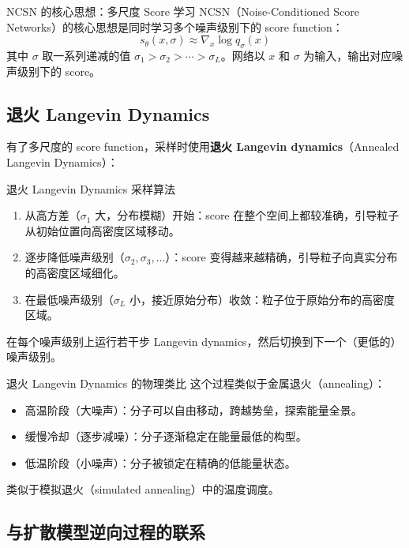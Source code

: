 \begin{importantbox}{NCSN 的核心思想：多尺度 Score 学习}
NCSN（Noise-Conditioned Score Networks）的核心思想是同时学习多个噪声级别下的 score function：
$$s_\theta(x, \sigma) \approx \nabla_x \log q_\sigma(x)$$
其中 $\sigma$ 取一系列递减的值 $\sigma_1 > \sigma_2 > \cdots > \sigma_L$。网络以 $x$ 和 $\sigma$ 为输入，输出对应噪声级别下的 score。
\end{importantbox}

\subsection{退火 Langevin Dynamics}

有了多尺度的 score function，采样时使用\textbf{退火 Langevin dynamics}（Annealed Langevin Dynamics）：

\begin{importantbox}{退火 Langevin Dynamics 采样算法}
\begin{enumerate}
    \item 从高方差（$\sigma_1$ 大，分布模糊）开始：score 在整个空间上都较准确，引导粒子从初始位置向高密度区域移动。
    \item 逐步降低噪声级别（$\sigma_2, \sigma_3, \ldots$）：score 变得越来越精确，引导粒子向真实分布的高密度区域细化。
    \item 在最低噪声级别（$\sigma_L$ 小，接近原始分布）收敛：粒子位于原始分布的高密度区域。
\end{enumerate}
在每个噪声级别上运行若干步 Langevin dynamics，然后切换到下一个（更低的）噪声级别。
\end{importantbox}

\begin{knowledgebox}{退火 Langevin Dynamics 的物理类比}
这个过程类似于金属退火（annealing）：
\begin{itemize}
    \item 高温阶段（大噪声）：分子可以自由移动，跨越势垒，探索能量全景。
    \item 缓慢冷却（逐步减噪）：分子逐渐稳定在能量最低的构型。
    \item 低温阶段（小噪声）：分子被锁定在精确的低能量状态。
\end{itemize}
类似于模拟退火（simulated annealing）中的温度调度。
\end{knowledgebox}

\subsection{与扩散模型逆向过程的联系}

